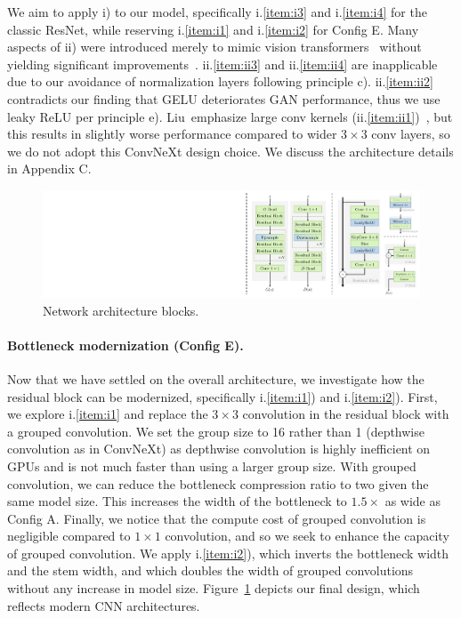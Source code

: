 We aim to apply i) to our model, specifically i.\ref{item:i3} and i.\ref{item:i4} for the classic ResNet, while reserving i.\ref{item:i1} and i.\ref{item:i2} for Config E. Many aspects of ii) were introduced merely to mimic vision transformers~\cite{swin,vit} without yielding significant improvements~\cite{convnext}. ii.\ref{item:ii3} and ii.\ref{item:ii4} are inapplicable due to our avoidance of normalization layers following principle c). ii.\ref{item:ii2} contradicts our finding that GELU deteriorates GAN performance, thus we use leaky ReLU per principle e). Liu~\etal emphasize large conv kernels (ii.\ref{item:ii1})~\cite{convnext}, but this results in slightly worse performance compared to wider $3\times3$ conv layers, so we do not adopt this ConvNeXt design choice. We discuss the architecture details in Appendix C.

\begin{figure}[t]
    \includegraphics[width=\linewidth,clip,trim={87pc 0cm 0cm 0cm}]{figures/network.pdf}
    \caption{Network architecture blocks.}
    \label{fig:network}
    \vspace{-0.7cm}
\end{figure}

\paragraph{Bottleneck modernization (Config E).}
Now that we have settled on the overall architecture, we investigate how the residual block can be modernized, specifically i.\ref{item:i1}) and i.\ref{item:i2}). First, we explore i.\ref{item:i1} and replace the $3\times3$ convolution in the residual block with a grouped convolution. We set the group size to 16 rather than 1 (\ie depthwise convolution as in ConvNeXt) as depthwise convolution is highly inefficient on GPUs and is not much faster than using a larger group size. With grouped convolution, we can reduce the bottleneck compression ratio to two given the same model size. This increases the width of the bottleneck to $1.5\times$ as wide as Config A. 
Finally, we notice that the compute cost of grouped convolution is negligible compared to $1\times1$ convolution, and so we seek to enhance the capacity of grouped convolution. We apply i.\ref{item:i2}), which inverts the bottleneck width and the stem width, and which doubles the width of grouped convolutions without any increase in model size. Figure~\ref{fig:network} depicts our final design, which reflects modern CNN architectures.
